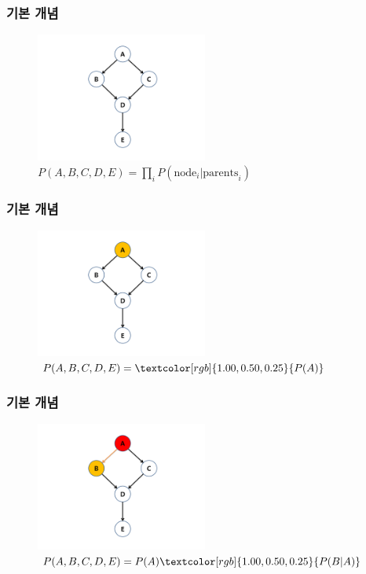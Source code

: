 \documentclass{beamer}
\begin{document}
\begin{frame}
\frametitle{기본 개념}

	\begin{figure}
		\includegraphics[height=120pt]{images/image93}
		\caption{{\scriptsize{}$P(A,B,C,D,E)=\prod_{i}P(\mbox{node}_{i}|\mbox{parents}_{i})$}}
	\end{figure}

\end{frame}



\begin{frame}
\frametitle{기본 개념}

	\begin{figure}
		\includegraphics[height=120pt]{images/image94}
		\caption{{\scriptsize{}$P(A,B,C,D,E)=\textcolor[rgb]{1.00,0.50,0.25}{P(A)}$}}
	\end{figure}

\end{frame}



\begin{frame}
\frametitle{기본 개념}

	\begin{figure}
		\includegraphics[height=120pt]{images/image95}
		\caption{{\scriptsize{}$P(A,B,C,D,E)=P(A)\textcolor[rgb]{1.00,0.50,0.25}{P(B|A)}$}}
	\end{figure}

\end{frame}
\end{document}
